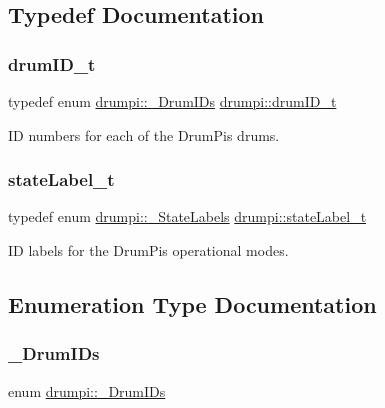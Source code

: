 \subsection{Typedef Documentation}
\mbox{\label{namespacedrumpi_a3897274035c1b939a604438abe648b1b}} 
\subsubsection{\texorpdfstring{drum\+I\+D\+\_\+t}{drumID\_t}}
{\footnotesize\ttfamily typedef enum \hyperlink{namespacedrumpi_ae52c777732de9715bae5bf0dfb40c650}{drumpi\+::\+\_\+\+Drum\+I\+Ds}  \hyperlink{namespacedrumpi_a3897274035c1b939a604438abe648b1b}{drumpi\+::drum\+I\+D\+\_\+t}}

ID numbers for each of the Drum\+Pi\textquotesingle{}s drums. \mbox{\label{namespacedrumpi_af70ab0854d65f24f7fa353fdc1c46bc9}} 
\subsubsection{\texorpdfstring{state\+Label\+\_\+t}{stateLabel\_t}}
{\footnotesize\ttfamily typedef enum \hyperlink{namespacedrumpi_a3b4ebb11c78873766e337e65d6597286}{drumpi\+::\+\_\+\+State\+Labels}  \hyperlink{namespacedrumpi_af70ab0854d65f24f7fa353fdc1c46bc9}{drumpi\+::state\+Label\+\_\+t}}

ID labels for the Drum\+Pi\textquotesingle{}s operational modes. 

\subsection{Enumeration Type Documentation}
\mbox{\label{namespacedrumpi_ae52c777732de9715bae5bf0dfb40c650}} 
\subsubsection{\texorpdfstring{\+\_\+\+Drum\+I\+Ds}{\_DrumIDs}}
{\footnotesize\ttfamily enum \hyperlink{namespacedrumpi_ae52c777732de9715bae5bf0dfb40c650}{drumpi\+::\+\_\+\+Drum\+I\+Ds}}

